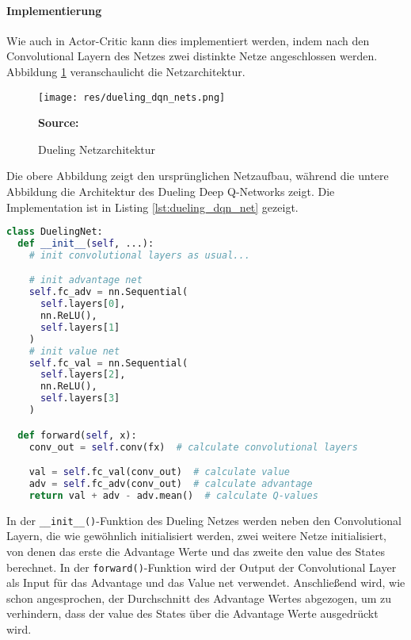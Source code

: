 \documentclass[11pt]{scrartcl}
\newcommand{\source}[1]{\vspace{-5pt} \caption*{\hfill \textbf{Source:} {#1}} }
\begin{document}
\paragraph*{Implementierung}
\noindent
\newline
Wie auch in Actor-Critic kann dies implementiert werden, indem nach den Convolutional
Layern des Netzes zwei distinkte Netze angeschlossen werden. Abbildung
\ref{fig:dueling_dqn_nets} veranschaulicht die Netzarchitektur.
\begin{figure}[htp]
  \centering
  \texttt{[image: res/dueling\_dqn\_nets.png]}
  \caption{Dueling Netzarchitektur}
  \source{\cite[~S.283 - Chapter 7 - Figure 11]{L2018}}
  \label{fig:dueling_dqn_nets}
\end{figure}
\noindent
Die obere Abbildung zeigt den ursprünglichen Netzaufbau, während die untere Abbildung die
Architektur des Dueling Deep Q-Networks zeigt. Die Implementation ist in Listing
\ref{lst:dueling_dqn_net} gezeigt.
\begin{lstlisting}[language=Python, caption=Dueling Net Implementation,
label=lst:dueling_dqn_net]
class DuelingNet:
  def __init__(self, ...):
    # init convolutional layers as usual...

    # init advantage net
    self.fc_adv = nn.Sequential(
      self.layers[0],
      nn.ReLU(),
      self.layers[1]
    )
    # init value net
    self.fc_val = nn.Sequential(
      self.layers[2],
      nn.ReLU(),
      self.layers[3]
    )

  def forward(self, x):
    conv_out = self.conv(fx)  # calculate convolutional layers

    val = self.fc_val(conv_out)  # calculate value
    adv = self.fc_adv(conv_out)  # calculate advantage
    return val + adv - adv.mean()  # calculate Q-values
\end{lstlisting}
\noindent
In der \lstinline!__init__()!-Funktion des Dueling Netzes werden neben den Convolutional
Layern, die wie gewöhnlich initialisiert werden, zwei weitere Netze initialisiert, von denen
das erste die Advantage Werte und das zweite den value des States berechnet.
In der \lstinline!forward()!-Funktion wird der Output der Convolutional Layer
als Input für das Advantage und das Value net verwendet. Anschließend wird, wie schon
angesprochen, der Durchschnitt des Advantage Wertes abgezogen, um zu verhindern, dass der
value des States über die Advantage Werte ausgedrückt wird.
\end{document}
